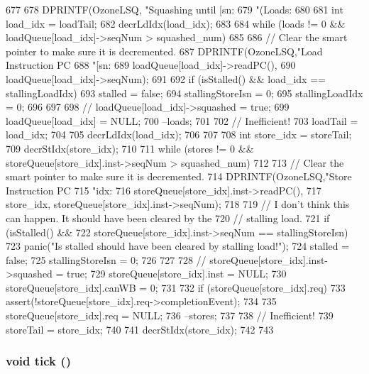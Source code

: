 \begin{DoxyCode}
677 {
678     DPRINTF(OzoneLSQ, "Squashing until [sn:%
679             "(Loads:%
680 
681     int load_idx = loadTail;
682     decrLdIdx(load_idx);
683 
684     while (loads != 0 && loadQueue[load_idx]->seqNum > squashed_num) {
685 
686         // Clear the smart pointer to make sure it is decremented.
687         DPRINTF(OzoneLSQ,"Load Instruction PC %
688                 "[sn:%
689                 loadQueue[load_idx]->readPC(),
690                 loadQueue[load_idx]->seqNum);
691 
692         if (isStalled() && load_idx == stallingLoadIdx) {
693             stalled = false;
694             stallingStoreIsn = 0;
695             stallingLoadIdx = 0;
696         }
697 
698 //        loadQueue[load_idx]->squashed = true;
699         loadQueue[load_idx] = NULL;
700         --loads;
701 
702         // Inefficient!
703         loadTail = load_idx;
704 
705         decrLdIdx(load_idx);
706     }
707 
708     int store_idx = storeTail;
709     decrStIdx(store_idx);
710 
711     while (stores != 0 && storeQueue[store_idx].inst->seqNum > squashed_num) {
712 
713         // Clear the smart pointer to make sure it is decremented.
714         DPRINTF(OzoneLSQ,"Store Instruction PC %
715                 "idx:%
716                 storeQueue[store_idx].inst->readPC(),
717                 store_idx, storeQueue[store_idx].inst->seqNum);
718 
719         // I don't think this can happen.  It should have been cleared by the
720         // stalling load.
721         if (isStalled() &&
722             storeQueue[store_idx].inst->seqNum == stallingStoreIsn) {
723             panic("Is stalled should have been cleared by stalling load!\n");
724             stalled = false;
725             stallingStoreIsn = 0;
726         }
727 
728 //        storeQueue[store_idx].inst->squashed = true;
729         storeQueue[store_idx].inst = NULL;
730         storeQueue[store_idx].canWB = 0;
731 
732         if (storeQueue[store_idx].req) {
733             assert(!storeQueue[store_idx].req->completionEvent);
734         }
735         storeQueue[store_idx].req = NULL;
736         --stores;
737 
738         // Inefficient!
739         storeTail = store_idx;
740 
741         decrStIdx(store_idx);
742     }
743 }
\end{DoxyCode}
\hypertarget{classOzoneLSQ_a873dd91783f9efb4a590aded1f70d6b0}{
\subsubsection[{tick}]{\setlength{\rightskip}{0pt plus 5cm}void tick ()}}
